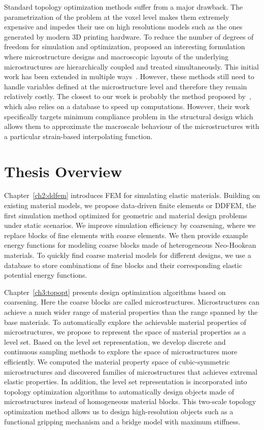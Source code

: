 Standard topology optimization methods suffer from a major drawback.
The parametrization of the problem at the voxel level makes them extremely expensive and impedes their use on high resolutions models such as the ones generated by modern 3D printing hardware.
To reduce the number of degrees of freedom for simulation and optimization, \citet{rodrigues:2002:h} proposed an interesting formulation where microstructure designs 
and macroscopic layouts of the underlying microstructures are hierarchically coupled and treated simultaneously.
This initial work has been extended in multiple ways~\citep{coelho:2008:h,nakshatrala:2013:non,yan:2014:concurrent,xia:2014:reduced}.
However, these methods still need to handle variables defined at
the microstructure level and therefore they remain relatively costly.
The closest to our work is probably the method proposed by~\citet{xia:2015:multiscale},
which also relies on a database to speed up computations.
However, their work specifically targets minimum compliance problem in the structural design which allows them to approximate the macroscale behaviour of the microstructures with a
particular strain-based interpolating function.
\section{Thesis Overview}\label{ch1:desc}
Chapter~\ref{ch2:ddfem} introduces FEM for simulating elastic materials.
Building on existing material models, we propose data-driven finite elements or DDFEM,
the first simulation method optimized for geometric and material design problems under static scenarios.
We improve simulation efficiency by coarsening, where we replace blocks of fine elements with coarse elements.
We then provide example energy functions for modeling coarse blocks made of heterogeneous Neo-Hookean materials.
To quickly find coarse material models for different designs, 
we use a database to store combinations of fine blocks and their corresponding elastic potential energy functions.

Chapter~\ref{ch3:topopt} presents design optimization algorithms based on coarsening.
Here the coarse blocks are called microstructures.
Microstructures can achieve a much wider range of material properties than the range spanned by the base materials.
To automatically explore the achievable material properties of microstructures, 
we propose to represent the space of material properties as a level set.
Based on the level set representation, we develop discrete and continuous sampling methods to explore the space of microstructures more efficiently.
We computed the material property space of cubic-symmetric microstructures and discovered families of microstructures that achieves extremal elastic properties.
In addition, the level set representation is incorporated into topology optimization algorithms to automatically design objects made of microstructures instead of homogeneous material blocks.
This two-scale topology optimization method allows us to design high-resolution objects such as a functional gripping mechanism and a bridge model with maximum stiffness.

